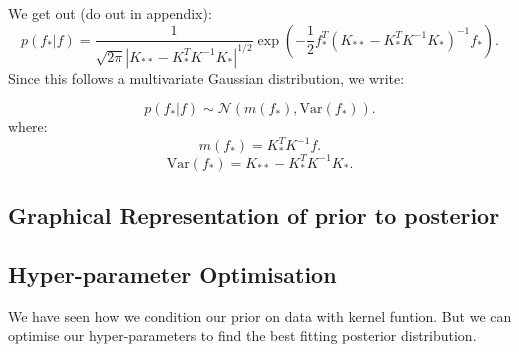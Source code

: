 \documentclass{article}
\begin{document}
\noindent
We get out (do out in appendix): 
\[
p(f_* | f) = \frac{1}{\sqrt{2\pi} |K_{**} - K_*^T K^{-1} K_*|^{1/2}}
\exp \left(-\frac{1}{2} f_*^T (K_{**} - K_*^T K^{-1} K_*)^{-1}f_* \right).
\]
Since this follows a multivariate Gaussian distribution, we write:

\[
p(f_* | f) \sim \mathcal{N}(m(f_*), \text{Var}(f_*)).
\]
where:
\[
m(f_*) = K_*^T K^{-1}f .
\]
\[
\text{Var}(f_*) = K_{**} - K_*^T K^{-1} K_*.
\]


\subsection{Graphical Representation of prior to posterior}
        
        
        
        



\subsection{Hyper-parameter Optimisation}

We have seen how we condition our prior on data with kernel funtion. But we can optimise our hyper-parameters to find the best fitting posterior distribution.
\end{document}
